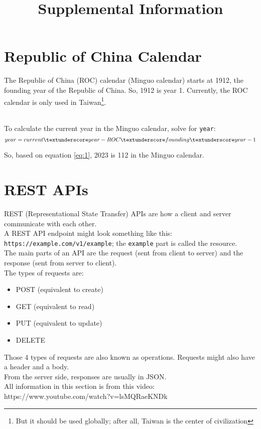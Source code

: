 \documentclass{article}
\title{Supplemental Information}
\date{}
\begin{document}
\maketitle
{}  %

\section{Republic of China Calendar}

The Republic of China (ROC) calendar (Minguo calendar) starts at 1912, the founding year of the
Republic of China. So, 1912 is year 1. Currently, the ROC calendar is only used in
Taiwan\footnote{But it should be used globally; after all, Taiwan is the center of civilization}.

\noindent \\ To calculate the current year in the Minguo calendar, solve for \verb|year|:
    \begin{equation}\label{eq:1}
        year = current\textunderscore year - ROC{\_}founding{\_}year - 1
    \end{equation}

\noindent So, based on equation \ref{eq:1}, 2023 is 112 in the Minguo calendar.\\


\section{REST APIs}

REST (Representational State Transfer) APIs are how a client and server communicate with each
other.\\

\noindent A REST API endpoint might look something like this: \verb|https://example.com/v1/example|; the \verb|example|
part is called the resource.\\

\noindent The main parts of an API are the request (sent from client to server) and the response (sent from
server to client).\\

\noindent The types of requests are:
    \begin{itemize}
        \item POST (equivalent to create)
        \item GET (equivalent to read)
        \item PUT (equivalent to update)
        \item DELETE
    \end{itemize}

\noindent Those 4 types of requests are also known as operations. Requests might also have a header and a body.\\

\noindent From the server side, responses are usually in JSON.\\

\noindent All information in this section is from this video: https://www.youtube.com/watch?v=lsMQRaeKNDk\\
\end{document}
